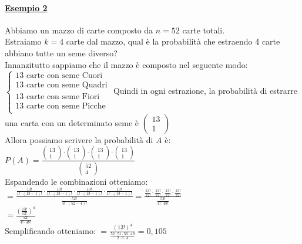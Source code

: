 \documentclass{article}
\begin{document}
\paragraph{\underline{Esempio 2}}
Abbiamo un mazzo di carte composto da $n=52$ carte totali. \\
Estraiamo $k=4$ carte dal mazzo, qual è la probabilità che estraendo 4 carte
abbiano tutte un seme diverso? \\
Innanzitutto sappiamo che il mazzo è composto nel seguente modo: 
$\begin{cases}
13 \text{ carte con seme Cuori} \\
13 \text{ carte con seme Quadri} \\
13 \text{ carte con seme Fiori} \\
13 \text{ carte con seme Picche} \\
\end{cases}$
Quindi in ogni estrazione, la probabilità di estrarre una carta con un determinato seme è $\left(\begin{matrix} 13 \\ 1\end{matrix}\right)$ \\
Allora possiamo scrivere la probabilità di $A$ è: \\
$P(A) = \frac{\left(\begin{matrix} 13 \\ 1\end{matrix}\right) \cdot \left(\begin{matrix} 13 \\ 1\end{matrix}\right) \cdot \left(\begin{matrix} 13 \\ 1\end{matrix}\right) \cdot \left(\begin{matrix} 13 \\ 1\end{matrix}\right)} {\left(\begin{matrix} 52 \\ 4\end{matrix}\right)}$ \\
Espandendo le combinazioni otteniamo: \\
$= \frac {\frac{13!}{1! \cdot (13-1)!} \cdot \frac{13!}{1! \cdot (13-1)!} \cdot \frac{13!}{1! \cdot (13-1)!} \cdot \frac{13!}{1! \cdot (13-1)!} } {\frac{52!}{4! \cdot (52-4)!}}
= \frac {\frac{13!}{12!} \cdot \frac{13!}{12!} \cdot \frac{13!}{12!} \cdot \frac{13!}{12!} } {\frac{52!}{4! \cdot 48!}}$ \\
$= \frac { \left( \frac{13!}{12!} \right)^4} {\frac{52!}{4! \cdot 48!}}$ \\
Semplificando otteniamo: $= \frac { \left( 13! \right)^4} {\frac{52 \cdot 51 \cdot 50 \cdot 49}{2 \cdot 3 \cdot4}} = 0,105$
\end{document}
